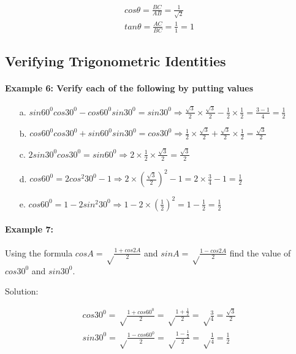 \documentclass{article}
\begin{document}
\[
  \begin{aligned}
    cos\theta = \frac{BC}{AB} = \frac{1}{\sqrt{2}} \\
    tan\theta = \frac{AC}{BC} = \frac{1}{1} = 1
  \end{aligned}
\]

\subsection{Verifying Trigonometric Identities}
\paragraph{Example 6: Verify each of the following by putting values}

\begin{enumerate}
  \item[a.] $sin 60^{0} cos 30^{0} - cos 60^{0} sin 30^{0} = sin 30^{0} \Rightarrow \frac{\sqrt{3}}{2} \times \frac{\sqrt{3}}{2} - \frac{1}{2} \times \frac{1}{2} = \frac{3-1}{4}=\frac{1}{2}$
  \item[b.] $cos 60^{0} cos 30^{0} + sin 60^{0} sin 30^{0} = cos 30^{0} \Rightarrow \frac{1}{2} \times \frac{\sqrt{3}}{2} + \frac{\sqrt{3}}{2} \times \frac{1}{2} = \frac{\sqrt{3}}{2}$
  \item[c.] $2 sin 30^{0} cos 30^{0} = sin 60^{0} \Rightarrow 2 \times \frac{1}{2} \times \frac{\sqrt{3}}{2} = \frac{\sqrt{3}}{2}$
  \item[d.] $cos 60^{0} = 2 cos^{2} 30^{0} - 1 \Rightarrow 2 \times \left(\frac{\sqrt{3}}{2}\right)^{2} - 1 = 2 \times \frac{3}{4} - 1 = \frac{1}{2}$
  \item[e.] $cos 60^{0} = 1 - 2 sin^{2} 30^{0} \Rightarrow 1 - 2 \times \left(\frac{1}{2}\right)^{2} = 1 - \frac{1}{2} = \frac{1}{2}$
\end{enumerate}

\paragraph{Example 7:}
Using the formula $cos A = \sqrt\frac{1+cos2A}{2}$ and $sin A = \sqrt\frac{1-cos2A}{2}$
find the value of $cos30^{0}$ and $sin30^{0}$.

Solution:

\[
  \begin{aligned}
    cos30^{0} = \sqrt\frac{1+cos60^{0}}{2} =  \sqrt\frac{1+\frac{1}{2}}{2} = \sqrt\frac{3}{4} = \frac{\sqrt{3}}{2} \\
    sin30^{0} = \sqrt\frac{1-cos60^{0}}{2} =  \sqrt\frac{1-\frac{1}{2}}{2} = \sqrt\frac{1}{4} = \frac{1}{2} \\
  \end{aligned}
\]
\end{document}
